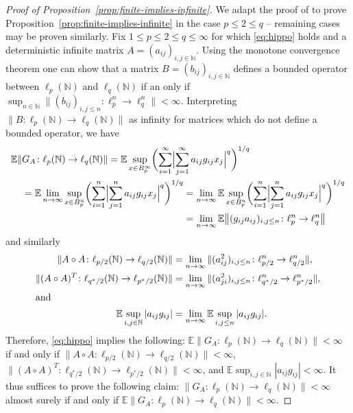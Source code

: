 \documentclass[a4paper]{amsart}
\theoremstyle{definition}
\theoremstyle{remark}
\numberwithin{equation}{section}
\newcommand*{\NN}{\mathbb{N}}
\newcommand*{\EE}{\mathbb{E}}
\newcommand*{\hadprod}{\mathbin{\circ}} %
\begin{document}
\begin{proof}[Proof of Proposition~\ref{prop:finite-implies-infinite}]
We adapt the proof of \cite[Corollary~1.2]{LvHY} to prove Proposition~\ref{prop:finite-implies-infinite} in the case $p\leq 2\leq q$ -- remaining cases may be proven similarly. Fix $1\le p \le 2\le q\le \infty$ for which \eqref{eq:hippo} holds and a deterministic infinite matrix $A=(a_{ij})_{i,j\in \NN}$. Using the monotone convergence theorem one can show that a matrix $B = (b_{ij})_{i,j\in \NN}$ defines a bounded operator between $\ell_p(\NN)$ and $\ell_q(\NN)$ if an only if $\sup_{n\in \NN} \|(b_{ij})_{i,j\le n}\colon \ell_p^n\to \ell_q^n\| < \infty$. Interpreting $\|B\colon \ell_p(\NN)\to \ell_q(\NN)\|$ as infinity for matrices which do not define a bounded operator, we have
\begin{align*}
	\MoveEqLeft[18]\EE \|G_A\colon \ell_p(\NN) \to \ell_q(\NN) \|
	= \EE \sup_{x\in B_p^\infty} \biggl( \sum_{i=1}^\infty \Bigl| \sum_{j=1}^\infty a_{ij}g_{ij}x_j \Bigr|^q \biggr)^{1/q}
	\\ =  \EE \lim_{n\to \infty} \sup_{x\in B_p^n} \biggl( \sum_{i=1}^n \Bigl| \sum_{j=1}^n a_{ij}g_{ij}x_j \Bigr|^q \biggr)^{1/q}
	&= \lim_{n\to \infty}  \EE \sup_{x\in B_p^n} \biggl( \sum_{i=1}^n \Bigl| \sum_{j=1}^n a_{ij}g_{ij}x_j \Bigr|^q \biggr)^{1/q}
	\\
	&= \lim_{n\to \infty} \EE \bigl\| (g_{ij}a_{ij})_{i,j\le n} \colon \ell_p^n \to \ell_q^n \bigr\|
\end{align*}
and similarly
\begin{align*}
	\|A\hadprod A \colon \ell_{p/2}(\NN) \to \ell_{q/2}(\NN) \| &= \lim_{n\to \infty} \|(a_{ij}^2)_{i,j\le n} \colon \ell^n_{p/2} \to \ell^n_{q/2} \|,\\
	\|(A\hadprod A)^T \colon \ell_{q^*/2}(\NN) \to \ell_{p^*/2}(\NN) \| &= \lim_{n\to \infty} \|(a_{ji}^2)_{i,j\le n} \colon \ell^n_{q^*/2} \to \ell^n_{p^*/2} \|,\\
\shortintertext{and}
	\EE\sup_{i, j \in \NN}|a_{ij}g_{ij}| &= \lim_{n\to \infty} \EE\sup_{i, j \le n}|a_{ij}g_{ij}|.
	\end{align*}
	Therefore, \eqref{eq:hippo} implies the following: $\EE \|G_A\colon \ell_p(\NN) \to \ell_q(\NN) \| <\infty $ if and only if $\|A\hadprod A \colon \ell_{p/2}(\NN) \to \ell_{q/2}(\NN) \| <\infty$, $\|(A\hadprod A)^T \colon \ell_{q^*/2}(\NN) \to \ell_{p^*/2}(\NN) \| <\infty$, and $\EE\sup_{i, j \in \NN}|a_{ij}g_{ij}| <\infty$.
	It thus suffices to prove the following claim: $\|G_A\colon \ell_p(\NN) \to \ell_q(\NN) \| <\infty $ almost surely  if and only if $\EE \|G_A\colon \ell_p(\NN) \to \ell_q(\NN) \| <\infty $.
	

\end{proof}
\end{document}
